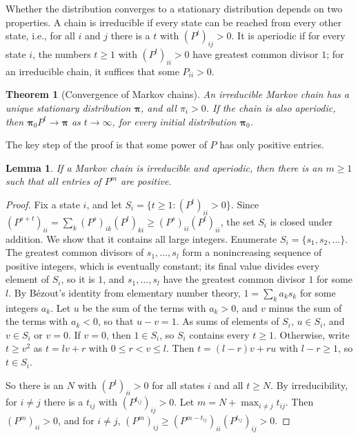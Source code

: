 \documentclass[11pt]{article}
\theoremstyle{definition}
\theoremstyle{plain}
\newtheorem{theorem}[definition]{Theorem}
\newtheorem{lemma}[definition]{Lemma}
\theoremstyle{remark}
\begin{document}
Whether the distribution converges to a stationary distribution depends on two properties. A chain is irreducible if every state can be reached from every other state, i.e., for all $i$ and $j$ there is a $t$ with $(P^t)_{ij} > 0$. It is aperiodic if for every state $i$, the numbers $t \geq 1$ with $(P^t)_{ii} > 0$ have greatest common divisor $1$; for an irreducible chain, it suffices that some $P_{ii} > 0$.

\begin{theorem}[Convergence of Markov chains]\label{thm:markov-convergence}
    An irreducible Markov chain has a unique stationary distribution $\boldsymbol{\pi}$, and all $\pi_i > 0$. If the chain is also aperiodic, then $\boldsymbol{\pi}_0 P^t \to \boldsymbol{\pi}$ as $t \to \infty$, for every initial distribution $\boldsymbol{\pi}_0$.
\end{theorem}

The key step of the proof is that some power of $P$ has only positive entries.

\begin{lemma}\label{lem:positive-power}
    If a Markov chain is irreducible and aperiodic, then there is an $m \geq 1$ such that all entries of $P^m$ are positive.
\end{lemma}

\begin{proof}
    Fix a state $i$, and let $S_i = \{t \geq 1 : (P^t)_{ii} > 0\}$. Since $(P^{s+t})_{ii} = \sum_k (P^s)_{ik}(P^t)_{ki} \geq (P^s)_{ii}(P^t)_{ii}$, the set $S_i$ is closed under addition. We show that it contains all large integers. Enumerate $S_i = \{s_1, s_2, \ldots\}$. The greatest common divisors of $s_1, \ldots, s_l$ form a nonincreasing sequence of positive integers, which is eventually constant; its final value divides every element of $S_i$, so it is $1$, and $s_1, \ldots, s_l$ have the greatest common divisor $1$ for some $l$. By B\'ezout's identity from elementary number theory, $1 = \sum_k a_ks_k$ for some integers $a_k$. Let $u$ be the sum of the terms with $a_k > 0$, and $v$ minus the sum of the terms with $a_k < 0$, so that $u - v = 1$. As sums of elements of $S_i$, $u \in S_i$, and $v \in S_i$ or $v = 0$. If $v = 0$, then $1 \in S_i$, so $S_i$ contains every $t \geq 1$. Otherwise, write $t \geq v^2$ as $t = lv + r$ with $0 \leq r < v \leq l$. Then $t = (l - r)v + ru$ with $l - r \geq 1$, so $t \in S_i$.

    So there is an $N$ with $(P^t)_{ii} > 0$ for all states $i$ and all $t \geq N$. By irreducibility, for $i \neq j$ there is a $t_{ij}$ with $(P^{t_{ij}})_{ij} > 0$. Let $m = N + \max_{i \neq j} t_{ij}$. Then $(P^m)_{ii} > 0$, and for $i \neq j$, $(P^m)_{ij} \geq (P^{m - t_{ij}})_{ii}(P^{t_{ij}})_{ij} > 0$.
\end{proof}
\end{document}
